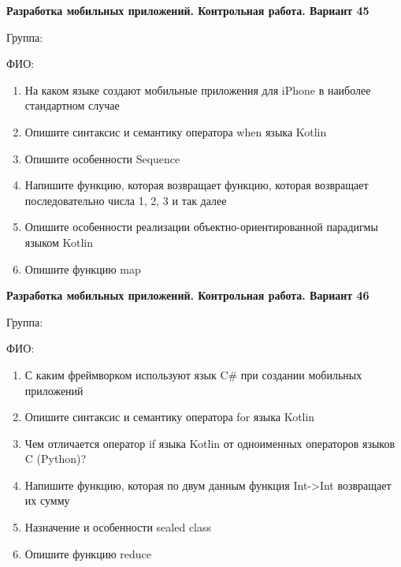 \documentclass[12pt]{article}
\begin{document}
\newpage\begin{minipage}{\textwidth}
\textbf{Разработка мобильных приложений. Контрольная работа. Вариант 45}

Группа: \underline{\hspace{3cm}}

ФИО: \underline{\hspace{10cm}}

\begin{enumerate}
\item На каком языке создают мобильные приложения для iPhone в наиболее стандартном случае
\item Опишите синтаксис и семантику оператора when языка Kotlin
\item Опишите особенности Sequence
\item Напишите функцию, которая возвращает функцию, которая возвращает последовательно числа 1, 2, 3 и так далее
\item Опишите особенности реализации объектно-ориентированной парадигмы языком Kotlin
\item Опишите функцию map

\end{enumerate}
\end{minipage}

\newpage\begin{minipage}{\textwidth}
\textbf{Разработка мобильных приложений. Контрольная работа. Вариант 46}

Группа: \underline{\hspace{3cm}}

ФИО: \underline{\hspace{10cm}}

\begin{enumerate}
\item С каким фреймворком используют язык C\# при создании мобильных приложений
\item Опишите синтаксис и семантику оператора for языка Kotlin
\item Чем отличается оператор if языка Kotlin от одноименных операторов языков C (Python)?
\item Напишите функцию, которая по двум данным функция Int->Int возвращает их сумму
\item Назначение и особенности sealed class
\item Опишите функцию reduce

\end{enumerate}
\end{minipage}

\newpage
\end{document}

